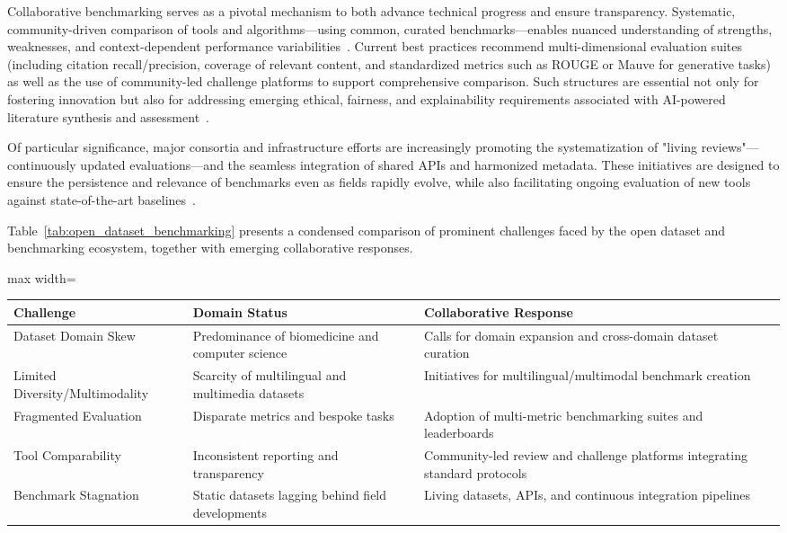 \documentclass[sigconf]{acmart}
\begin{document}
Collaborative benchmarking serves as a pivotal mechanism to both advance technical progress and ensure transparency. Systematic, community-driven comparison of tools and algorithms—using common, curated benchmarks—enables nuanced understanding of strengths, weaknesses, and context-dependent performance variabilities~\cite{ref31,ref32,ref33,ref78,ref80,ref102,ref104,ref106}. Current best practices recommend multi-dimensional evaluation suites (including citation recall/precision, coverage of relevant content, and standardized metrics such as ROUGE or Mauve for generative tasks) as well as the use of community-led challenge platforms to support comprehensive comparison. Such structures are essential not only for fostering innovation but also for addressing emerging ethical, fairness, and explainability requirements associated with AI-powered literature synthesis and assessment~\cite{ref32,ref104,ref106,ref80,ref98}.

Of particular significance, major consortia and infrastructure efforts are increasingly promoting the systematization of "living reviews"—continuously updated evaluations—and the seamless integration of shared APIs and harmonized metadata. These initiatives are designed to ensure the persistence and relevance of benchmarks even as fields rapidly evolve, while also facilitating ongoing evaluation of new tools against state-of-the-art baselines~\cite{ref35,ref68,ref78,ref106}.

Table~\ref{tab:open_dataset_benchmarking} presents a condensed comparison of prominent challenges faced by the open dataset and benchmarking ecosystem, together with emerging collaborative responses.

\begin{table*}[htbp]
\centering
\caption{Key Challenges and Collaborative Responses in Open Datasets and Benchmarking}
\label{tab:open_dataset_benchmarking}
\begin{adjustbox}{max width=\textwidth}
\begin{tabular}{@{}llll@{}}
\toprule
\textbf{Challenge} & \textbf{Domain Status} & \textbf{Collaborative Response} &  \\ 
\midrule
Dataset Domain Skew & Predominance of biomedicine and computer science & Calls for domain expansion and cross-domain dataset curation &  \\
Limited Diversity/Multimodality & Scarcity of multilingual and multimedia datasets & Initiatives for multilingual/multimodal benchmark creation &  \\
Fragmented Evaluation & Disparate metrics and bespoke tasks & Adoption of multi-metric benchmarking suites and leaderboards &  \\
Tool Comparability & Inconsistent reporting and transparency & Community-led review and challenge platforms integrating standard protocols &  \\
Benchmark Stagnation & Static datasets lagging behind field developments & Living datasets, APIs, and continuous integration pipelines &  \\
\bottomrule
\end{tabular}
\end{adjustbox}
\end{table*}
\end{document}
